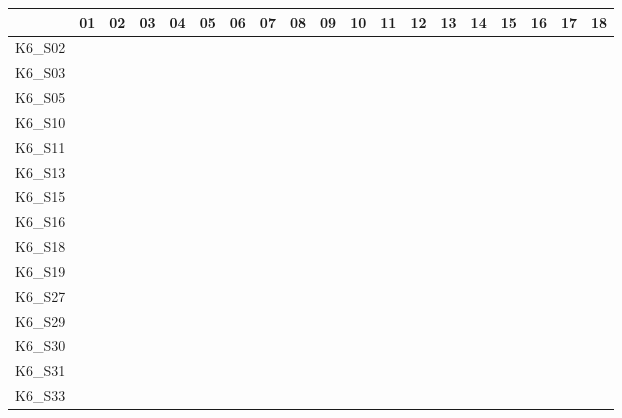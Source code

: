 \begin{table}
    \setlength{\tabcolsep}{0.2em}
    \tiny
    \centering
    \begin{tabular}{l|rrrrrrrrrrrrrrrrrr}
        \toprule
                & 01 & 02 & 03 & 04 & 05 & 06 & 07 & 08 & 09 & 10 & 11 & 12 & 13 & 14 & 15 & 16 & 17 & 18 \\
        \midrule
        K6\_S02 & \y & \y & \y & \y & \y & \y & \y & \y & \y & \y & \y & \y & \y & \x & \y & \y & \x & \y \\
        K6\_S03 & \y & \y & \y & \y & \y & \y & \y & \y & \y & \y & \y & \x & \y & \y & \y & \y & \y & \y \\
        K6\_S05 & \y & \y & \y & \y & \y & \y & \y & \y & \y & \y & \y & \x & \x & \x & \x & \y & \y & \y \\
        K6\_S10 & \y & \x & \x & \y & \y & \y & \y & \y & \y & \y & \y & \y & \x & \x & \y & \x & \y & \y \\
        K6\_S11 & \y & \y & \y & \y & \y & \y & \y & \y & \y & \y & \y & \x & \y & \y & \y & \y & \y & \y \\
        K6\_S13 & \y & \y & \y & \y & \y & \y & \y & \y & \y & \y & \y & \y & \y & \y & \y & \y & \y & \y \\
        K6\_S15 & \y & \y & \y & \y & \y & \y & \y & \y & \y & \y & \y & \y & \y & \y & \y & \y & \y & \y \\
        K6\_S16 & \y & \y & \y & \y & \y & \y & \y & \y & \y & \y & \y & \y & \y & \y & \y & \y & \y & \y \\
        K6\_S18 & \y & \x & \x & \y & \y & \y & \y & \y & \y & \y & \y & \y & \x & \y & \y & \y & \y & \y \\
        K6\_S19 & \y & \y & \y & \y & \y & \y & \y & \y & \y & \y & \y & \y & \y & \y & \x & \y & \y & \y \\
        K6\_S27 & \y & \y & \y & \y & \y & \y & \y & \y & \y & \y & \y & \y & \y & \y & \y & \y & \y & \y \\
        K6\_S29 & \y & \y & \x & \y & \y & \y & \y & \y & \y & \y & \y & \y & \y & \y & \x & \y & \x & \y \\
        K6\_S30 & \y & \x & \x & \y & \y & \y & \y & \y & \y & \y & \y & \y & \x & \x & \y & \y & \y & \y \\
        K6\_S31 & \y & \y & \y & \y & \y & \y & \y & \x & \y & \y & \y & \y & \y & \y & \y & \y & \y & \y \\
        K6\_S33 & \y & \y & \y & \y & \y & \y & \y & \x & \y & \y & \y & \x & \y & \y & \y & \y & \y & \y \\

\end{tabular}
\end{table}
